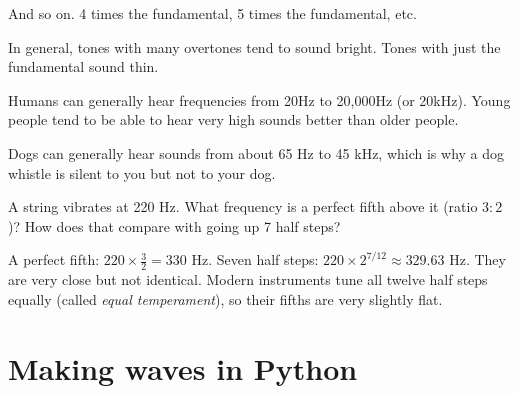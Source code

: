\begin{center}
    
\end{center}
And so on. 4 times the fundamental, 5 times the fundamental, etc.

In general, tones with many overtones tend to sound bright. Tones
with just the fundamental sound thin.

Humans can generally hear frequencies from 20Hz to 20,000Hz (or
20kHz).  Young people tend to be able to hear very high sounds better
than older people.

Dogs can generally hear sounds from about 65 Hz to 45 kHz, which is why a
dog whistle is silent to you but not to your dog.

\begin{Exercise}[title={A perfect fifth}, label=sound_fifth]
A string vibrates at 220 Hz. What frequency is a perfect fifth above it
(ratio $3:2$)? How does that compare with going up 7 half steps?
\end{Exercise}
\begin{Answer}[ref=sound_fifth]
A perfect fifth: $220 \times \frac{3}{2} = 330$ Hz. Seven half steps:
$220 \times 2^{7/12} \approx 329.63$ Hz. They are very close but not
identical. Modern instruments tune all twelve half steps equally (called
\emph{equal temperament}), so their fifths are very slightly flat.
\end{Answer}

\section{Making waves in Python}

